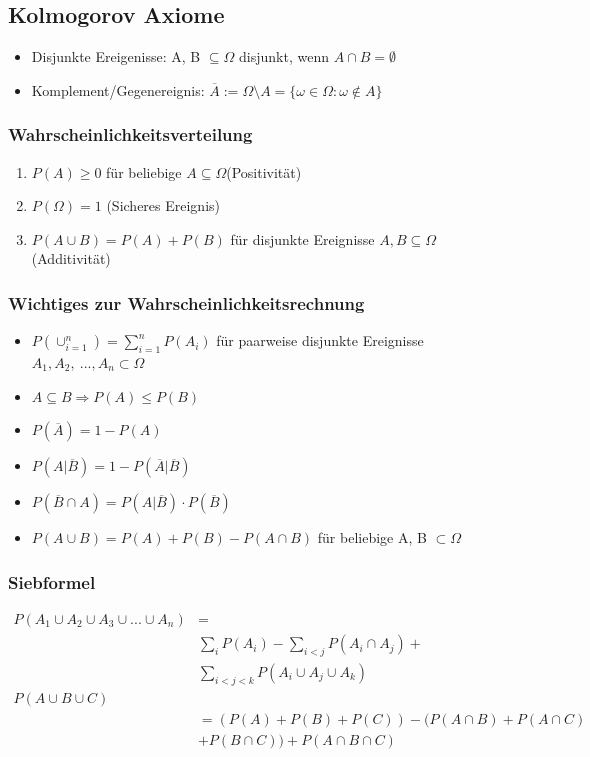 \documentclass[10pt,a4paper,landscape]{article}
\begin{document}
\begin{multicols}{4}
\subsection{Kolmogorov Axiome}
\begin{itemize}
\item Disjunkte Ereigenisse: A, B $\subseteq \Omega$ disjunkt, wenn $A \cap B = \emptyset$
\item Komplement/Gegenereignis: \( \overline{A} := \Omega \setminus A = \{ \omega \in \Omega : \omega \notin A \} \)
\end{itemize}

\subsubsection{Wahrscheinlichkeitsverteilung}
\begin{enumerate}
\item $P(A)\geqslant 0$ für beliebige $A\subseteq \Omega$(Positivität)
\item $P(\Omega )=1$ (Sicheres Ereignis)
\item $P(A \cup B) = P(A) + P(B)$ für disjunkte Ereignisse $A,B \subseteq \Omega$ (Additivität)
\end{enumerate}

\subsubsection*{Wichtiges zur Wahrscheinlichkeitsrechnung}
\begin{itemize}
\item $P(\cup _{i=1} ^{n}) = \sum_{i=1}^n P(A_i)$ für paarweise disjunkte Ereignisse $A_1, A_2, ~..., A_n \subset \Omega$
\item $A \subseteq B \Rightarrow P(A) \leqslant P(B)$
\item \(P (\overline{A}) = 1 - P(A)\)
\item $P(A|\overline{B})= 1 - P(\overline{A} |\overline{B})$
\item $P(\overline{B}\cap A)=P(A|\overline{B})\cdot P(\overline{B})$
\item $P(A\cup B) = P(A) + P(B) -P(A\cap B)$ für beliebige A, B $\subset \Omega$
\end{itemize}

\subsubsection*{Siebformel}
{\tiny
\begin{align*}
P(A_1 \cup A_2 \cup A_3 \cup ... \cup A_n) &= \\
&\sum _{i}P(A_i)- \sum_{i<j}P(A_i \cap A_j)+ \\
&\sum _{i<j<k}P(A_i \cup A_j \cup A_k) \\
P(A \cup B \cup C) \\
&=(P(A)+P(B)+P(C))-(P(A\cap B) + P(A \cap C) \\
&+ P(B\cap C)) + P(A\cap B \cap C)
\end{align*}
}


\end{multicols}
\end{document}
